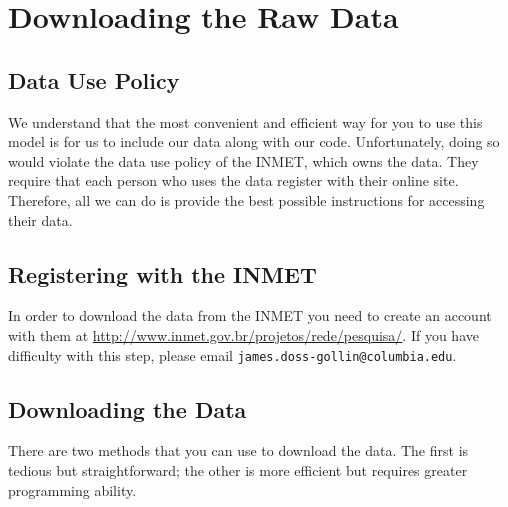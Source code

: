 \documentclass[11pt]{article} %
\begin{document}
\section{Downloading the Raw Data} \label{dload}

\subsection{Data Use Policy}
We understand that the most convenient and efficient way for you to use this model is for us to include our data along with our code.
Unfortunately, doing so would violate the data use policy of the \ac{INMET}, which owns the data.
They require that each person who uses the data register with their online site.
Therefore, all we can do is provide the best possible instructions for accessing their data.

\subsection{Registering with the \acs{INMET}} \label{register}
In order to download the data from the \ac{INMET} you need to create an account with them at \url{http://www.inmet.gov.br/projetos/rede/pesquisa/}.
If you have difficulty with this step, please email \texttt{james.doss-gollin@columbia.edu}.

\subsection{Downloading the Data}

There are two methods that you can use to download the data.
The first is tedious but straightforward; the other is more efficient but requires greater programming ability.
\end{document}
